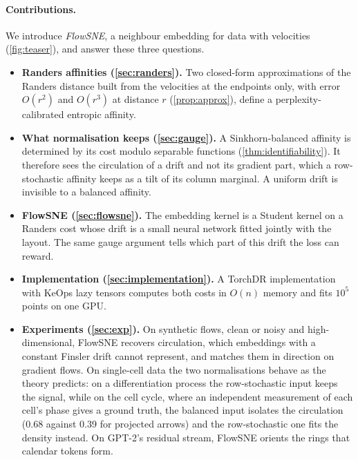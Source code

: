 \paragraph{Contributions.}
We introduce \emph{FlowSNE}, a neighbour embedding for data with
velocities (\cref{fig:teaser}), and answer these three questions.
\begin{itemize}
  \item \textbf{Randers affinities (\cref{sec:randers}).} Two closed-form
    approximations of the Randers distance built from the velocities at
    the endpoints only, with error $O(r^2)$ and $O(r^3)$ at distance
    $r$ (\cref{prop:approx}), define a perplexity-calibrated entropic
    affinity.
  \item \textbf{What normalisation keeps (\cref{sec:gauge}).} A
    Sinkhorn-balanced affinity is determined by its cost modulo
    separable functions (\cref{thm:identifiability}). It therefore sees
    the circulation of a drift and not its gradient part, which a
    row-stochastic affinity keeps as a tilt of its column marginal. A
    uniform drift is invisible to a balanced affinity.
  \item \textbf{FlowSNE (\cref{sec:flowsne}).} The embedding kernel is a
    Student kernel on a Randers cost whose drift is a small neural network
    fitted jointly with the layout. The same gauge argument tells which
    part of this drift the loss can reward.
  \item \textbf{Implementation (\cref{sec:implementation}).} A
    TorchDR implementation with KeOps lazy tensors computes both costs
    in $O(n)$ memory and fits $10^5$ points on one GPU.
  \item \textbf{Experiments (\cref{sec:exp}).} On synthetic flows,
    clean or noisy and high-dimensional, FlowSNE recovers circulation,
    which embeddings with a constant Finsler drift cannot represent, and
    matches them in direction on gradient flows. On single-cell data the
    two normalisations behave as the theory predicts: on a
    differentiation process the row-stochastic input keeps the signal,
    while on the cell cycle, where an independent measurement of each
    cell's phase gives a ground truth, the balanced input isolates the
    circulation (0.68 against 0.39 for projected arrows) and the
    row-stochastic one fits the density instead. On GPT-2's residual
    stream, FlowSNE orients the rings that calendar tokens form.
\end{itemize}
